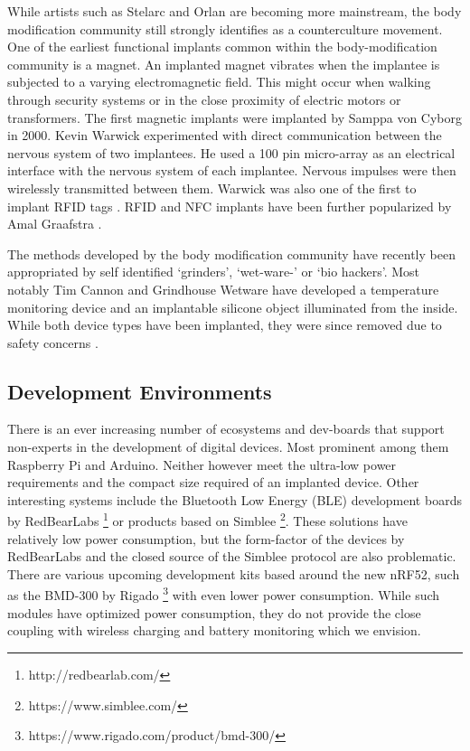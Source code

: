 \documentclass[runningheads,a4paper]{llncs}
\begin{document}
While artists such as Stelarc and Orlan are becoming more mainstream, the body modification community still strongly identifies as a counterculture movement. One of the earliest functional implants common within the body-modification community is a magnet. An implanted magnet vibrates when the implantee is subjected to a varying electromagnetic field. This might occur when walking through security systems or in the close proximity of electric motors or transformers. The first magnetic implants were implanted by Samppa von Cyborg in 2000.
Kevin Warwick experimented with direct communication between the nervous system of two implantees. He used a 100 pin micro-array as an electrical interface with the nervous system of each implantee. Nervous impulses were then wirelessly transmitted between them. Warwick was also one of the first to implant RFID tags \cite{Warwick}. RFID and NFC implants have been further popularized by Amal Graafstra \cite{Graafstra}.

The methods developed by the body modification community have recently been appropriated by self identified ‘grinders’, ‘wet-ware-’ or ‘bio hackers’. Most notably Tim Cannon and Grindhouse Wetware have developed a temperature monitoring device and an implantable silicone object illuminated from the inside. While both device types have been implanted, they were since removed due to safety concerns \cite{Motherboard}.

\subsection{Development Environments}
There is an ever increasing number of ecosystems and dev-boards that support non-experts in the development of digital devices. Most prominent among them Raspberry Pi and Arduino. Neither however meet the ultra-low power requirements and the compact size required of an implanted device. Other interesting systems include the Bluetooth Low Energy (BLE) development boards by RedBearLabs \footnote{http://redbearlab.com/}  or products based on Simblee \footnote{https://www.simblee.com/}. These solutions have relatively low power consumption, but the form-factor of the devices by RedBearLabs and the closed source of the Simblee protocol are also problematic. There are various upcoming development kits based around the new nRF52, such as the BMD-300  by Rigado \footnote{https://www.rigado.com/product/bmd-300/} with even lower power consumption. While such modules have optimized power consumption, they do not provide the close coupling with wireless charging and battery monitoring which we envision.
\end{document}
